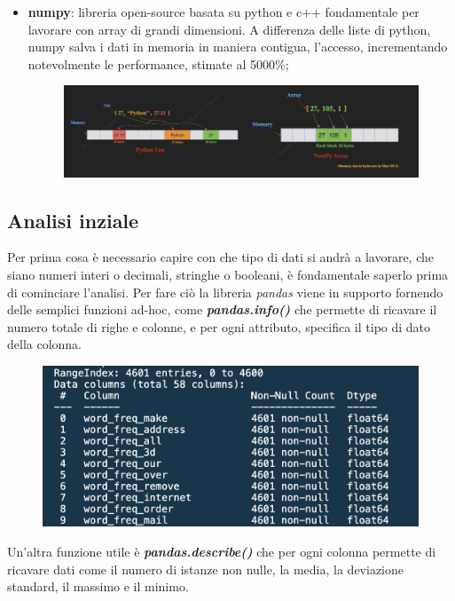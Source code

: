 \documentclass[12pt,a4paper]{article}
\begin{document}
\begin{itemize}
    \item \textbf{numpy}: libreria open-source basata su python e c++ fondamentale per lavorare con array di grandi dimensioni. A differenza delle liste di python, numpy salva i dati in memoria in maniera contigua, l'accesso, incrementando notevolmente le performance, stimate al 5000\%;
    \begin{figure}[h]
        \includegraphics[width=1\columnwidth]{numpy_vs_list.png}
        \caption{}
    \end{figure}
   
\end{itemize}

\clearpage
\subsection{Analisi inziale}
Per prima cosa è necessario capire con che tipo di dati si andrà a lavorare, che siano numeri interi o decimali, stringhe o booleani, è fondamentale saperlo prima di cominciare l'analisi.
Per fare ciò la libreria \textit{pandas} viene in supporto fornendo delle semplici funzioni ad-hoc, come\textbf{ \textit{pandas.info()}} che permette di ricavare il numero totale di righe e colonne, e per ogni attributo, specifica il tipo di dato della colonna.
\begin{figure}[h]
    \includegraphics[width=1\columnwidth]{pandas_info.png}
    \caption{}
\end{figure}
Un'altra funzione utile è \textit{\textbf{pandas.describe()}} che per ogni colonna permette di ricavare dati come il numero di istanze non nulle, la media, la deviazione standard, il massimo e il minimo.
\end{document}

